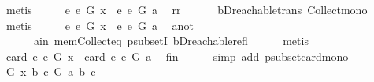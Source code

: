 \begin{isabellebody}
\ metis\isanewline
\ \ \isamarkupfalse%
\ \isamarkupfalse%
\ {\isachardoublequoteopen}{\isacharbraceleft}{\kern0pt}e{\isachardot}{\kern0pt}\ e\ {\isasymrightarrow}\isactrlsup {\isacharasterisk}{\kern0pt}\isactrlbsub G\isactrlesub \ x{\isacharbraceright}{\kern0pt}\ {\isasymsubseteq}\ {\isacharbraceleft}{\kern0pt}e{\isachardot}{\kern0pt}\ e\ {\isasymrightarrow}\isactrlsup {\isacharasterisk}{\kern0pt}\isactrlbsub G\isactrlesub \ a{\isacharbraceright}{\kern0pt}{\isachardoublequoteclose}\ \isamarkupfalse%
\ rr\isanewline
\ \ \ \ \ \ bD{\isachardot}{\kern0pt}reachable{\isacharunderscore}{\kern0pt}trans\ Collect{\isacharunderscore}{\kern0pt}mono\ \isamarkupfalse%
\ metis\isanewline
\ \ \isamarkupfalse%
\ \isamarkupfalse%
\ {\isachardoublequoteopen}{\isacharbraceleft}{\kern0pt}e{\isachardot}{\kern0pt}\ e\ {\isasymrightarrow}\isactrlsup {\isacharasterisk}{\kern0pt}\isactrlbsub G\isactrlesub \ x{\isacharbraceright}{\kern0pt}\ {\isasymsubset}\ {\isacharbraceleft}{\kern0pt}e{\isachardot}{\kern0pt}\ e\ {\isasymrightarrow}\isactrlsup {\isacharasterisk}{\kern0pt}\isactrlbsub G\isactrlesub \ a{\isacharbraceright}{\kern0pt}{\isachardoublequoteclose}\ \isamarkupfalse%
\ a{\isacharunderscore}{\kern0pt}not\isanewline
\ \ \ \ \ \ a{\isacharunderscore}{\kern0pt}in\ mem{\isacharunderscore}{\kern0pt}Collect{\isacharunderscore}{\kern0pt}eq\ psubsetI\ bD{\isachardot}{\kern0pt}reachable{\isacharunderscore}{\kern0pt}refl\isanewline
\ \ \ \ \isamarkupfalse%
\ metis\ \isanewline
\ \ \isamarkupfalse%
\ \isamarkupfalse%
\ {\isachardoublequoteopen}card\ {\isacharbraceleft}{\kern0pt}e{\isachardot}{\kern0pt}\ e\ {\isasymrightarrow}\isactrlsup {\isacharasterisk}{\kern0pt}\isactrlbsub G\isactrlesub \ x{\isacharbraceright}{\kern0pt}\ {\isacharless}{\kern0pt}\ card\ {\isacharbraceleft}{\kern0pt}e{\isachardot}{\kern0pt}\ e\ {\isasymrightarrow}\isactrlsup {\isacharasterisk}{\kern0pt}\isactrlbsub G\isactrlesub \ a{\isacharbraceright}{\kern0pt}{\isachardoublequoteclose}\ \isamarkupfalse%
\ fin\isanewline
\ \ \ \ \isamarkupfalse%
\ {\isacharparenleft}{\kern0pt}simp\ add{\isacharcolon}{\kern0pt}\ psubset{\isacharunderscore}{\kern0pt}card{\isacharunderscore}{\kern0pt}mono{\isacharparenright}{\kern0pt}\isanewline
\ \ \isamarkupfalse%
\ \isamarkupfalse%
\ {\isachardoublequoteopen}{\isacharparenleft}{\kern0pt}{\isacharparenleft}{\kern0pt}G{\isacharcomma}{\kern0pt}\ x{\isacharcomma}{\kern0pt}\ b{\isacharcomma}{\kern0pt}\ c{\isacharparenright}{\kern0pt}{\isacharcomma}{\kern0pt}\ G{\isacharcomma}{\kern0pt}\ a{\isacharcomma}{\kern0pt}\ b{\isacharcomma}{\kern0pt}\ c{\isacharparenright}{\kern0pt}\isanewline

\end{isabellebody}
